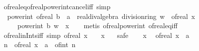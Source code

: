 \begin{isabellebody}
\ of{\isacharunderscore}{\kern0pt}real{\isacharunderscore}{\kern0pt}eq{\isacharunderscore}{\kern0pt}of{\isacharunderscore}{\kern0pt}real{\isacharunderscore}{\kern0pt}power{\isacharunderscore}{\kern0pt}int{\isacharunderscore}{\kern0pt}cancel{\isacharunderscore}{\kern0pt}iff\ {\isacharbrackleft}{\kern0pt}simp{\isacharbrackright}{\kern0pt}{\isacharcolon}{\kern0pt}\isanewline
\ \ {\isachardoublequoteopen}power{\isacharunderscore}{\kern0pt}int\ {\isacharparenleft}{\kern0pt}of{\isacharunderscore}{\kern0pt}real\ b\ {\isacharcolon}{\kern0pt}{\isacharcolon}{\kern0pt}\ {\isacharprime}{\kern0pt}a\ {\isacharcolon}{\kern0pt}{\isacharcolon}{\kern0pt}\ {\isacharbraceleft}{\kern0pt}real{\isacharunderscore}{\kern0pt}div{\isacharunderscore}{\kern0pt}algebra{\isacharcomma}{\kern0pt}\ division{\isacharunderscore}{\kern0pt}ring{\isacharbraceright}{\kern0pt}{\isacharparenright}{\kern0pt}\ w\ {\isacharequal}{\kern0pt}\ of{\isacharunderscore}{\kern0pt}real\ x\ {\isasymlongleftrightarrow}\isanewline
\ \ \ \ \ power{\isacharunderscore}{\kern0pt}int\ b\ w\ {\isacharequal}{\kern0pt}\ x{\isachardoublequoteclose}\isanewline
%
\isadelimproof
\ \ %
\endisadelimproof
%
\isatagproof
{}\isamarkupfalse%
\ {\isacharparenleft}{\kern0pt}metis\ of{\isacharunderscore}{\kern0pt}real{\isacharunderscore}{\kern0pt}power{\isacharunderscore}{\kern0pt}int\ of{\isacharunderscore}{\kern0pt}real{\isacharunderscore}{\kern0pt}eq{\isacharunderscore}{\kern0pt}iff{\isacharparenright}{\kern0pt}%
\endisatagproof
{\isafoldproof}%
%
\isadelimproof
\isanewline
%
\endisadelimproof
\isanewline
{}\isamarkupfalse%
\ of{\isacharunderscore}{\kern0pt}real{\isacharunderscore}{\kern0pt}in{\isacharunderscore}{\kern0pt}Ints{\isacharunderscore}{\kern0pt}iff\ {\isacharbrackleft}{\kern0pt}simp{\isacharbrackright}{\kern0pt}{\isacharcolon}{\kern0pt}\ {\isachardoublequoteopen}of{\isacharunderscore}{\kern0pt}real\ x\ {\isasymin}\ {\isasymint}\ {\isasymlongleftrightarrow}\ x\ {\isasymin}\ {\isasymint}{\isachardoublequoteclose}\isanewline
%
\isadelimproof
%
\endisadelimproof
%
\isatagproof
{}\isamarkupfalse%
\ safe\isanewline
\ \ \isamarkupfalse%
\ x\ \isamarkupfalse%
\ {\isachardoublequoteopen}{\isacharparenleft}{\kern0pt}of{\isacharunderscore}{\kern0pt}real\ x\ {\isacharcolon}{\kern0pt}{\isacharcolon}{\kern0pt}\ {\isacharprime}{\kern0pt}a{\isacharparenright}{\kern0pt}\ {\isasymin}\ {\isasymint}{\isachardoublequoteclose}\isanewline
\ \ \isamarkupfalse%
\ \isamarkupfalse%
\ n\ \ {\isachardoublequoteopen}{\isacharparenleft}{\kern0pt}of{\isacharunderscore}{\kern0pt}real\ x\ {\isacharcolon}{\kern0pt}{\isacharcolon}{\kern0pt}\ {\isacharprime}{\kern0pt}a{\isacharparenright}{\kern0pt}\ {\isacharequal}{\kern0pt}\ of{\isacharunderscore}{\kern0pt}int\ n{\isachardoublequoteclose}\isanewline

\end{isabellebody}
